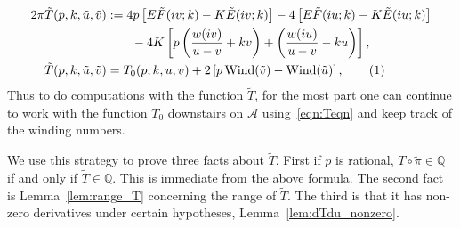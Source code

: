 \documentclass{article}
\numberwithin{equation}{section}
\numberwithin{figure}{section}
\newcommand{\labelthis}[1]{\addtocounter{equation}{1}\tag{\theequation}\label{#1}}
\DeclareMathOperator{\Wind}{Wind}
\newcommand{\iu}{i}
\newcommand{\Q}{\mathbb{Q}}
\begin{document}
\begin{align*}
2\pi \tilde{T}(p,k,\tilde{u},\tilde{v}) 
&:= 4p \left[ E \tilde{F}(\iu v; k) - K \tilde{E}(\iu v; k)\right]
-4 \left[ E \tilde{F}(\iu u; k) - K \tilde{E}(\iu u; k)\right] \\
&\qquad- 4 K \left[p\left(\frac{w(\iu v)}{u-v} + kv \right) + \left(\frac{w(\iu u)}{u-v} - ku \right) \right],\\
\tilde{T}(p,k,\tilde{u},\tilde{v})
&= T_0(p,k,u,v) + 2\left[ p\Wind(\tilde{v}) - \Wind(\tilde{u}) \right],
\labelthis{eqn:tilde T computable}
\end{align*}
Thus to do computations with the function $\tilde{T}$, for the most part one can continue to work with the function $T_0$ downstairs on $\mathcal{A}$ using~\eqref{eqn:Teqn} and keep track of the winding numbers. 

We use this strategy to prove three facts about $\tilde{T}$. First if $p$ is rational, $T\circ\tilde{\pi} \in \Q$ if and only if $\tilde{T} \in \Q$. This is immediate from the above formula. The second fact is Lemma~\ref{lem:range_T} concerning the range of $\tilde{T}$. The third is that it has non-zero derivatives under certain hypotheses, Lemma~\ref{lem:dTdu_nonzero}.
\end{document}
